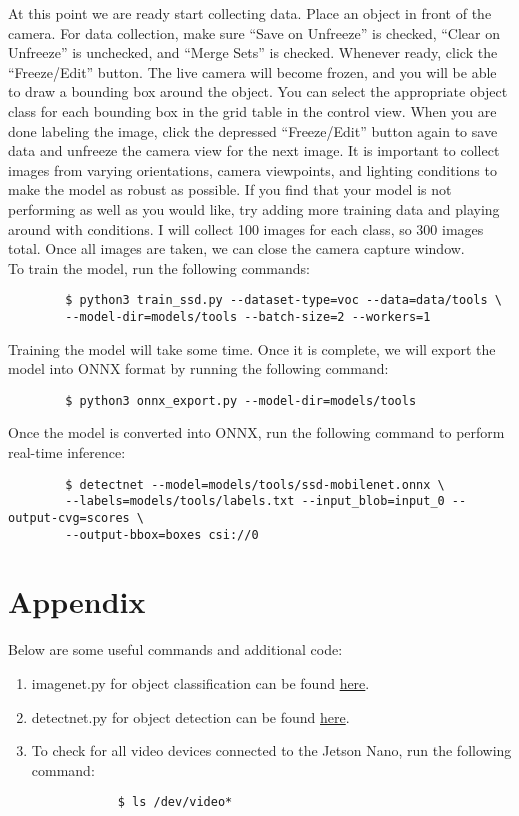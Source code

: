 \documentclass[letter, 12pt]{article}
\begin{document}
	\noindent At this point we are ready start collecting data. Place an object in front of the camera. For data collection, make sure ``Save on Unfreeze'' is checked, ``Clear on Unfreeze'' is unchecked, and ``Merge Sets'' is checked. Whenever ready, click the ``Freeze/Edit'' button. The live camera will become frozen, and you will be able to draw a bounding box around the object. You can select the appropriate object class for each bounding box in the grid table in the control view. When you are done labeling the image, click the depressed ``Freeze/Edit'' button again to save data and unfreeze the camera view for the next image. It is important to collect images from varying orientations, camera viewpoints, and lighting conditions to make the model as robust as possible. If you find that your model is not performing as well as you would like, try adding more training data and playing around with conditions. I will collect 100 images for each class, so 300 images total. Once all images are taken, we can close the camera capture window.
	\vspace{1ex} \\
	\noindent To train the model, run the following commands:
	\begin{verbatim}
		$ python3 train_ssd.py --dataset-type=voc --data=data/tools \
		--model-dir=models/tools --batch-size=2 --workers=1
	\end{verbatim}
	\noindent Training the model will take some time. Once it is complete, we will export the model into ONNX format by running the following command:
	\begin{verbatim}
		$ python3 onnx_export.py --model-dir=models/tools
	\end{verbatim}
	\noindent Once the model is converted into ONNX, run the following command to perform real-time inference:
	\begin{verbatim}
		$ detectnet --model=models/tools/ssd-mobilenet.onnx \
		--labels=models/tools/labels.txt --input_blob=input_0 --output-cvg=scores \
		--output-bbox=boxes csi://0
	\end{verbatim}
	
	\newpage
	\section{Appendix}
	\noindent Below are some useful commands and additional code:
	\begin{enumerate}
		\item imagenet.py for object classification can be found \href{https://github.com/dusty-nv/jetson-inference/blob/master/python/examples/imagenet.py}{here}.
		\item detectnet.py for object detection can be found \href{https://github.com/dusty-nv/jetson-inference/blob/master/python/examples/detectnet.py}{here}.
		\item To check for all video devices connected to the Jetson Nano, run the following command:
		\begin{verbatim}
			$ ls /dev/video*
		\end{verbatim}
	\end{enumerate}
	
\end{document}
